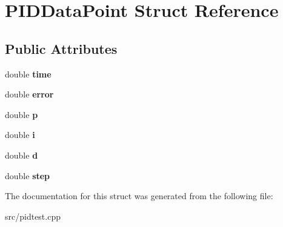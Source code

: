 \hypertarget{structPIDDataPoint}{}\section{P\+I\+D\+Data\+Point Struct Reference}
\label{structPIDDataPoint}
\subsection*{Public Attributes}
\begin{DoxyCompactItemize}
\item 
\mbox{\label{structPIDDataPoint_a187b5e81e75466a827535883d32cf58c}} 
double {\bfseries time}
\item 
\mbox{\label{structPIDDataPoint_a7d21cd9e9767da2c07176780eafb7f9f}} 
double {\bfseries error}
\item 
\mbox{\label{structPIDDataPoint_af786ef7b26e1fc20603ab026b0d828b0}} 
double {\bfseries p}
\item 
\mbox{\label{structPIDDataPoint_ab394291471c2941ba60c6b061f3801ff}} 
double {\bfseries i}
\item 
\mbox{\label{structPIDDataPoint_a074a6d224d88f3926a7542dbd235284b}} 
double {\bfseries d}
\item 
\mbox{\label{structPIDDataPoint_a44d10198278ca28699d86d65810252c3}} 
double {\bfseries step}
\end{DoxyCompactItemize}


The documentation for this struct was generated from the following file\+:\begin{DoxyCompactItemize}
\item 
src/pidtest.\+cpp\end{DoxyCompactItemize}
